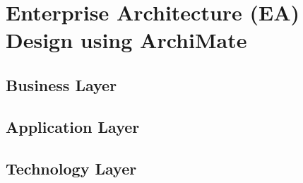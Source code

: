 \chapter{Enterprise Architecture (EA) Design using ArchiMate}

\section{Business Layer}

\section{Application Layer}

\section{Technology Layer}

\FloatBarrier
\newpage